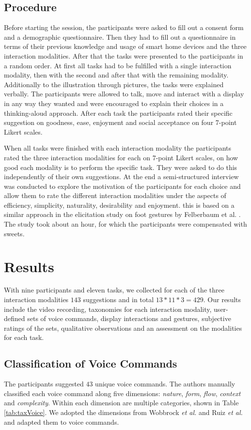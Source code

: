 \documentclass[sigchi]{acmart}
\begin{document}
	\subsection{Procedure}
	Before starting the session, the participants were asked to fill out a consent form and a demographic questionnaire. Then they had to fill out a questionnaire in terms of their previous knowledge and usage of smart home devices and the three interaction modalities. After that the tasks were presented to the participants in a random order. At first all tasks had to be fulfilled with a single interaction modality, then with the second and after that with the remaining modality. Additionally to the illustration through pictures, the tasks were explained verbally. The participants were allowed to talk, move and interact with a display in any way they wanted and were encouraged to explain their choices in a thinking-aloud approach. After each task the participants rated their specific suggestion on goodness, ease, enjoyment and social acceptance on four 7-point Likert scales. 
	
	When all tasks were finished with each interaction modality the participants rated the three interaction modalities for each on 7-point Likert scales, on how good each modality is to perform the specific task. They were asked to do this independently of their own suggestions. At the end a semi-structured interview was conducted to explore the motivation of the participants for each choice and allow them to rate the different interaction modalities under the aspects of efficiency, simplicity, naturality, desirability and enjoyment. this is based on a similar approach in the elicitation study on foot gestures by Felberbaum et al. \cite{Felberbaum.2018}. The study took about an hour, for which the participants were compensated with sweets.
	
	\section{Results}
	With nine participants and eleven tasks, we collected for each of the three interaction modalities $143$ suggestions and in total $13*11*3=429$. Our results include the video recording, taxonomies for each interaction modality, user-defined sets of voice commands, display interactions and gestures, subjective ratings of the sets, qualitative observations and an assessment on the modalities for each task. 
	
	\subsection{Classification of Voice Commands}
	The participants suggested $43$ unique voice commands. The authors manually classified each voice command along five dimensions: \textit{nature}, \textit{form}, \textit{flow}, \textit{context} and \textit{complexity}. Within each dimension are multiple categories, shown in Table \ref{tab:taxVoice}. We adopted the dimensions from Wobbrock \textit{et al.} \citep{Wobbrock.2009} and Ruiz \textit{et al.} \citep{Ruiz.2011} and adapted them to voice commands. 
	
\end{document}
